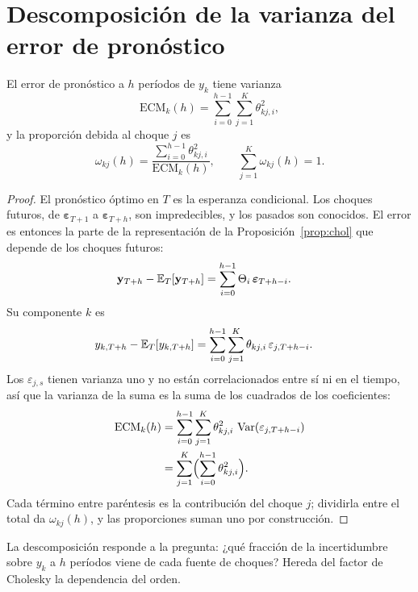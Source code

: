 \section{Descomposición de la varianza del error de pronóstico}

\begin{proposicion}\label{prop:fevd}
El error de pronóstico a $h$ períodos de $y_k$ tiene varianza
\[
  \mathrm{ECM}_k(h)=\sum_{i=0}^{h-1}\sum_{j=1}^{K}\theta_{kj,i}^2,
\]
y la proporción debida al choque $j$ es
\[
  \omega_{kj}(h)=\frac{\sum_{i=0}^{h-1}\theta_{kj,i}^2}{\mathrm{ECM}_k(h)},\qquad \sum_{j=1}^{K}\omega_{kj}(h)=1 .
\]
\end{proposicion}

\begin{proof}
El pronóstico óptimo en $T$ es la esperanza condicional. Los choques futuros, de
$\boldsymbol\varepsilon_{T+1}$ a $\boldsymbol\varepsilon_{T+h}$, son impredecibles, y los pasados son conocidos.
El error es entonces la parte de la representación de la Proposición~\ref{prop:chol} que depende de los choques
futuros:
\begin{align*}
  \mathbf y_{T+h}-\mathbb{E}_T[\mathbf y_{T+h}] &= \sum_{i=0}^{h-1}\Theta_i\,\boldsymbol\varepsilon_{T+h-i}.
\end{align*}
Su componente $k$ es
\begin{align*}
  y_{k,T+h}-\mathbb{E}_T[y_{k,T+h}] &= \sum_{i=0}^{h-1}\sum_{j=1}^{K}\theta_{kj,i}\,\varepsilon_{j,T+h-i}.
\end{align*}
Los $\varepsilon_{j,s}$ tienen varianza uno y no están correlacionados entre sí ni en el tiempo, así que la
varianza de la suma es la suma de los cuadrados de los coeficientes:
\begin{align*}
  \mathrm{ECM}_k(h) &= \sum_{i=0}^{h-1}\sum_{j=1}^{K}\theta_{kj,i}^2\,\operatorname{Var}(\varepsilon_{j,T+h-i})\\
                    &= \sum_{j=1}^{K}\Bigl(\sum_{i=0}^{h-1}\theta_{kj,i}^2\Bigr).
\end{align*}
Cada término entre paréntesis es la contribución del choque $j$; dividirla entre el total da $\omega_{kj}(h)$,
y las proporciones suman uno por construcción.
\end{proof}

La descomposición responde a la pregunta: ¿qué fracción de la incertidumbre sobre $y_k$ a $h$ períodos viene de
cada fuente de choques? Hereda del factor de Cholesky la dependencia del orden.

